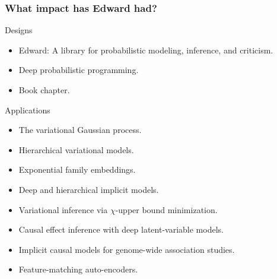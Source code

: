 \documentclass[10pt,
               xcolor={usenames,dvipsnames},
               hyperref={colorlinks,linktoc=all,citecolor=Plum,linkcolor=MidnightBlue,urlcolor=MidnightBlue},noamssymb]{beamer}
\begin{document}
\begin{frame}
\frametitle{What impact has Edward had?}
Designs
\begin{itemize}
\item
Edward: A library for probabilistic modeling, inference, and criticism.
\item
Deep probabilistic programming.
\item
Book chapter.
\end{itemize}

Applications
\begin{itemize}
\item
The variational Gaussian process.
\item
Hierarchical variational models.
\item
Exponential family embeddings.
\item
Deep and hierarchical implicit models.
\item
Variational inference via $\chi$-upper bound minimization.
\item
Causal effect inference with deep latent-variable models.
\item
Implicit causal models for genome-wide association studies.
\item
Feature-matching auto-encoders.
\end{itemize}
\end{frame}

\end{document}
